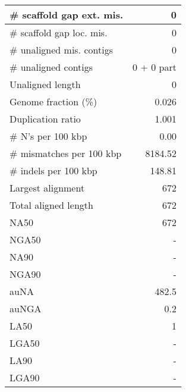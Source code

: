 \documentclass[12pt,a4paper]{article}
\begin{document}
\begin{table}[ht]
\begin{center}
\begin{tabular}{|l*{1}{|r}|}
\# scaffold gap ext. mis. & 0 \\ \hline
\# scaffold gap loc. mis. & 0 \\ \hline
\# unaligned mis. contigs & 0 \\ \hline
\# unaligned contigs & 0 + 0 part \\ \hline
Unaligned length & 0 \\ \hline
Genome fraction (\%) & 0.026 \\ \hline
Duplication ratio & 1.001 \\ \hline
\# N's per 100 kbp & 0.00 \\ \hline
\# mismatches per 100 kbp & 8184.52 \\ \hline
\# indels per 100 kbp & 148.81 \\ \hline
Largest alignment & 672 \\ \hline
Total aligned length & 672 \\ \hline
NA50 & 672 \\ \hline
NGA50 & - \\ \hline
NA90 & - \\ \hline
NGA90 & - \\ \hline
auNA & 482.5 \\ \hline
auNGA & 0.2 \\ \hline
LA50 & 1 \\ \hline
LGA50 & - \\ \hline
LA90 & - \\ \hline
LGA90 & - \\ \hline
\end{tabular}
\end{center}
\end{table}
\end{document}
